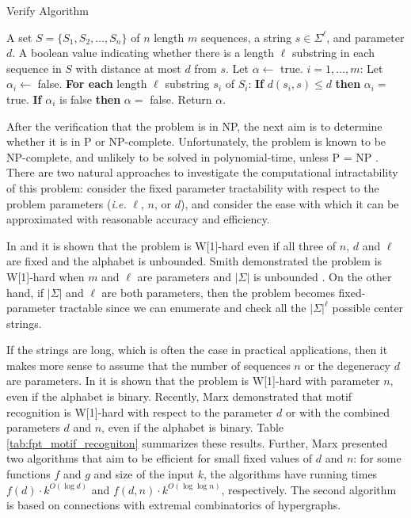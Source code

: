 \begin{algorithm*}[h]
\caption{Verify Algorithm}
\begin{algorithmic}
 A set $S = \{S_1, S_2, \ldots, S_n \}$ of $n$ length $m$ sequences, a string $s \in \Sigma^{\ell}$, and parameter $d$.
 A boolean value indicating whether there is a length $\ell$ substring in each sequence in $S$ with distance at most $d$ from $s$.
\STATE Let $\alpha \leftarrow$ true.
 $i = 1, \ldots, m$:
\STATE \hspace{5mm} Let $\alpha_i \leftarrow$ false.
\STATE \hspace{5mm} {\bf For each} length $\ell$ substring $s_i$ of $S_i$:
\STATE \hspace{10mm} {\bf If} $d(s_i, s) \leq d$ {\bf then} $\alpha_i =$  true. 
\STATE \hspace{5mm} {\bf If} $\alpha_i$ is false {\bf then} $\alpha =$ false.
\STATE Return $\alpha$.
\end{algorithmic}
\end{algorithm*}

After the verification that the problem is in NP, the next aim is to determine whether it is in P or NP-complete.  Unfortunately, the problem is known to be NP-complete, and unlikely to be solved in polynomial-time, unless P = NP \cite{FL97}. There are two natural approaches to investigate the computational intractability of this problem: consider the fixed parameter tractability with respect to the problem parameters ({\em i.e.} $\ell$, $n$, or $d$), and consider the ease with which it can be approximated with reasonable accuracy and efficiency. 

In \cite{ESW03} and \cite{FGN06} it is shown that the problem is W[1]-hard even if all three of $n$, $d$ and $\ell$ are fixed and the alphabet is unbounded. Smith demonstrated the problem is W[1]-hard when $m$ and $\ell$ are parameters and $|\Sigma|$ is unbounded \cite{asmith}.   On the other hand, if $|\Sigma|$ and $\ell$ are both parameters, then the problem becomes fixed-parameter tractable since we can enumerate and check all the $|\Sigma|^{\ell}$ possible center strings.  

If the strings are long, which is often the case in practical applications, then it makes more sense to assume that the number of sequences $n$ or the degeneracy $d$ are parameters.  In \cite{FGN06} it is shown that the problem is W[1]-hard with parameter $n$, even if the alphabet is binary.  Recently, Marx \cite{marx} demonstrated that motif recognition is W[1]-hard with respect to the parameter $d$ or with the combined parameters $d$ and $n$, even if the alphabet is binary.   Table \ref{tab:fpt_motif_recogniton} summarizes these results. Further, Marx \cite{marx} presented two algorithms that aim to be efficient for small fixed values of $d$ and $n$: for some functions $f$ and $g$ and size of the input $k$, the algorithms have running times $f(d) \cdot k^{O(\log d)}$ and $f(d, n) \cdot k^{O(\log \log n)}$, respectively.  The second algorithm is based on connections with extremal combinatorics of hypergraphs.  

